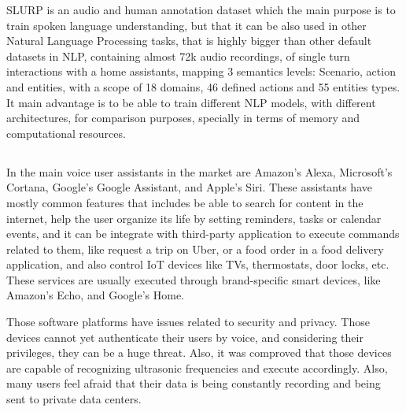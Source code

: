 SLURP \cite{slurp} is an audio and human annotation dataset which the main purpose is to train spoken language understanding, but that it can be also used in other Natural Language Processing tasks, that is highly bigger than other default datasets in NLP, containing almost 72k audio recordings, of single turn interactions with a home assistants, mapping 3 semantics levels: Scenario, action and entities, with a scope of 18 domains, 46 defined actions and 55 entities types. It main advantage is to be able to train different NLP models, with different architectures, for comparison purposes, specially in terms of memory and computational resources.

\subsection{\RQII}

In \cite{Hoy201881} the main voice user assistants in the market are Amazon's Alexa, Microsoft's Cortana, Google's Google Assistant, and Apple's Siri. These assistants have mostly common features that includes be able to search for content in the internet, help the user organize its life by setting reminders, tasks or calendar events, and it can be integrate with third-party application to execute commands related to them, like request a trip on Uber, or a food order in a food delivery application, and also control IoT devices like TVs, thermostats, door locks, etc. These services are usually executed through brand-specific smart devices, like Amazon's Echo, and Google's Home.

Those software platforms have issues related to security and privacy. Those devices cannot yet authenticate their users by voice, and considering their privileges, they can be a huge threat. Also, it was comproved that those devices are capable of recognizing ultrasonic frequencies and execute accordingly. Also, many users feel afraid that their data is being constantly recording and being sent to private data centers.

\subsection{\RQIII}

